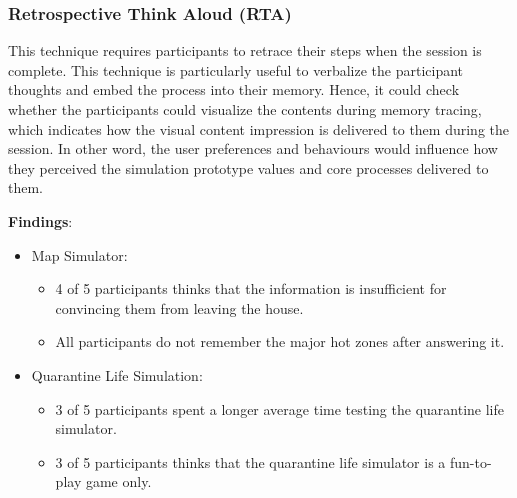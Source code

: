     \subsubsection{Retrospective Think Aloud (RTA)}
      \par This technique requires participants to retrace their steps when the session is complete. This technique
      is particularly useful to verbalize the participant thoughts and embed the process into their memory.
      Hence, it could check whether the participants could visualize the contents during memory tracing,
      which indicates how the visual content impression is delivered to them during the session. In other
      word, the user preferences and behaviours would influence how they perceived the simulation
      prototype values and core processes delivered to them.
      \par \textbf{Findings}:
      \begin{itemize}
        \item Map Simulator:
          \begin{itemize}
            \item 4 of 5 participants thinks that the information is insufficient for convincing them from leaving the house.
            \item All participants do not remember the major hot zones after answering it.
          \end{itemize}
        \item Quarantine Life Simulation:
          \begin{itemize}
            \item 3 of 5 participants spent a longer average time testing the quarantine life simulator.
            \item 3 of 5 participants thinks that the quarantine life simulator is a fun-to-play game only.
          \end{itemize}
      \end{itemize}
    
